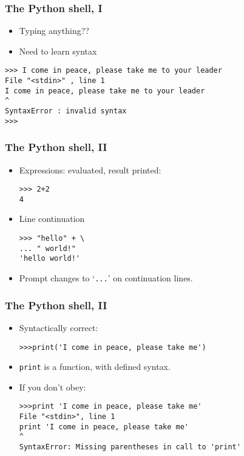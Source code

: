 \begin{frame}[fragile]  \frametitle{The Python shell, I}
  \begin{itemize}
 \item Typing anything??

\item Need to learn syntax
\end{itemize}

\begin{lstlisting}
>>> I come in peace, please take me to your leader
File "<stdin>" , line 1
I come in peace, please take me to your leader
^
SyntaxError : invalid syntax
>>>
\end{lstlisting}
\end{frame}

\begin{frame}[fragile]\frametitle{The Python shell, II}
\begin{itemize}
\item Expressions: evaluated, result printed:
\begin{lstlisting}
>>> 2+2
4
\end{lstlisting}
\item Line continuation \\ 
\begin{lstlisting}
>>> "hello" + \
... " world!"
'hello world!'
\end{lstlisting}
\item Prompt changes to `\texttt{...}' on continuation lines.
\end{itemize}
\end{frame}

\begin{frame}[fragile]\frametitle{The Python shell, II}
\begin{itemize}
\item Syntactically correct:
	\begin{lstlisting}
>>>print('I come in peace, please take me')
	\end{lstlisting}

\item \lstinline|print| is a function, with defined syntax. 
\item If you don't obey: \\ 
\begin{lstlisting}
>>>print 'I come in peace, please take me'
File "<stdin>", line 1
print 'I come in peace, please take me'
^
SyntaxError: Missing parentheses in call to 'print'
\end{lstlisting}
\end{itemize}
\end{frame}

